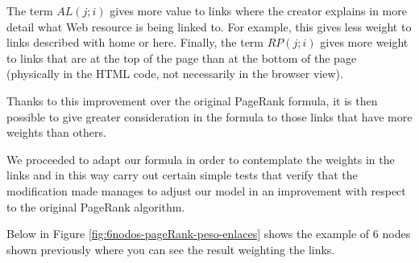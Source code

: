 
The term $AL(j;i)$ gives more value to links where the creator explains in more detail what Web resource is being linked to. For example, this gives less weight to links described with home or here. Finally, the term $RP(j; i)$ gives more weight to links that are at the top of the page than at the bottom of the page (physically in the HTML code, not necessarily in the browser view).

Thanks to this improvement over the original PageRank formula, it is then possible to give greater consideration in the formula to those links that have more weights than others.

We proceeded to adapt our formula in order to contemplate the weights in the links and in this way carry out certain simple tests that verify that the modification made manages to adjust our model in an improvement with respect to the original PageRank algorithm.

Below in Figure \ref{fig:6nodos-pageRank-peso-enlaces} shows the example of 6 nodes shown previously where you can see the result weighting the links.

